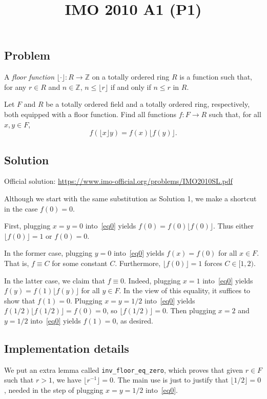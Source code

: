 \documentclass{article}
\title{IMO 2010 A1 (P1)}
\author{}
\date{}
\newcommand{\Z}{\mathbb{Z}}
\begin{document}
\maketitle



\subsection*{Problem}

A \emph{floor function} $\lfloor \cdot \rfloor : R \to \Z$ on a totally ordered ring $R$ is a function such that, for any $r \in R$ and $n \in \Z$, $n \leq \lfloor r \rfloor$ if and only if $n \leq r$ in $R$.

Let $F$ and $R$ be a totally ordered field and a totally ordered ring, respectively, both equipped with a floor function.
Find all functions $f : F \to R$ such that, for all $x, y \in F$,
\[ f(\lfloor x \rfloor y) = f(x) \lfloor f(y) \rfloor. \tag{*}\label{eq0} \]



\subsection*{Solution}

Official solution: \url{https://www.imo-official.org/problems/IMO2010SL.pdf}

Although we start with the same substitution as Solution 1, we make a shortcut in the case $f(0) = 0$.

First, plugging $x = y = 0$ into~\eqref{eq0} yields $f(0) = f(0) \lfloor f(0) \rfloor$.
Thus either $\lfloor f(0) \rfloor = 1$ or $f(0) = 0$.

In the former case, plugging $y = 0$ into~\eqref{eq0} yields $f(x) = f(0)$ for all $x \in F$.
That is, $f \equiv C$ for some constant $C$.
Furthermore, $\lfloor f(0) \rfloor = 1$ forces $C \in [1, 2)$.

In the latter case, we claim that $f \equiv 0$.
Indeed, plugging $x = 1$ into~\eqref{eq0} yields $f(y) = f(1) \lfloor f(y) \rfloor$ for all $y \in F$.
In the view of this equality, it suffices to show that $f(1) = 0$.
Plugging $x = y = 1/2$ into~\eqref{eq0} yields $f(1/2) \lfloor f(1/2) \rfloor = f(0) = 0$, so $\lfloor f(1/2) \rfloor = 0$.
Then plugging $x = 2$ and $y = 1/2$ into~\eqref{eq0} yields $f(1) = 0$, as desired.



\subsection*{Implementation details}

We put an extra lemma called \texttt{inv\_floor\_eq\_zero}, which proves that given $r \in F$ such that $r > 1$, we have $\lfloor r^{-1} \rfloor = 0$.
The main use is just to justify that $\lfloor 1/2 \rfloor = 0$, needed in the step of plugging $x = y = 1/2$ into~\eqref{eq0}.
\end{document}
